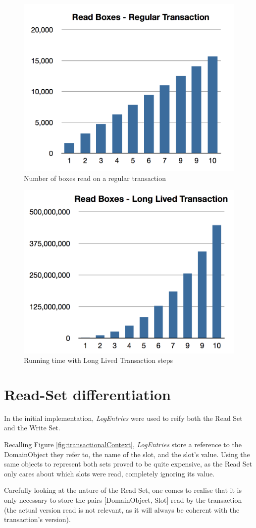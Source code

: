 \begin{figure}
\centering
\includegraphics[width=0.6\linewidth]{reg-box}
\caption{Number of boxes read on a regular transaction}
\label{fig:reg-box}
\end{figure}

\begin{figure}
\centering
\includegraphics[width=0.6\linewidth]{long-box-v1}
\caption{Running time with Long Lived Transaction steps}
\label{fig:long-box-v1}
\end{figure}

\section{Read-Set differentiation}

In the initial implementation, {\it LogEntries} were used to reify
both the Read Set and the Write Set.

Recalling Figure \ref{fig:transactionalContext}, {\it LogEntries} store a
reference to the DomainObject they refer to, the name of the slot, and
the slot's value. Using the same objects to represent both sets proved
to be quite expensive, as the Read Set only cares about which slots
were read, completely ignoring its value.

Carefully looking at the nature of the Read Set, one comes to realise
that it is only necessary to store the pairs [DomainObject, Slot] read
by the transaction (the actual version read is not relevant, as it
will always be coherent with the transaction's version).

